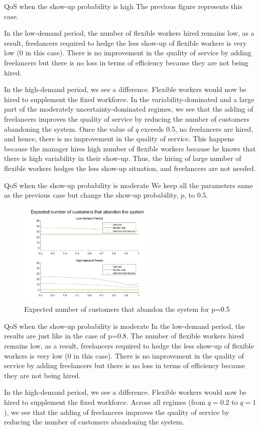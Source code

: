 \documentclass[8pt]{beamer}
\begin{document}
\begin{frame}{QoS when the show-up probability is high}
The previous figure represents this case. \bigskip

In the low-demand period, the number of flexible workers hired remains low, as a result, freelancers required to hedge the less show-up of flexible workers is very low (0 in this case). There is no improvement in the quality of service by adding freelancers but there is no loss in terms of efficiency because they are not being hired.\bigskip

In the high-demand period, we see a difference. Flexible workers would now be hired to supplement the fixed workforce. In the variability-dominated and a large part of the moderately uncertainty-dominated regimes, we see that the adding of freelancers improves the quality of service by reducing the number of customers abandoning the system. Once the value of $q$ exceeds 0.5, no freelancers are hired, and hence, there is no improvement in the quality of service. This happens because the manager hires high number of flexible workers because he knows that there is high variability in their show-up. Thus, the hiring of large number of flexible workers hedges the less show-up situation, and freelancers are not needed.
\end{frame}

\begin{frame}{QoS when the show-up probability is moderate}
We keep all the parameters same as the previous case but change the show-up probability, $p$, to $0.5$. \\
\begin{figure}[hbt!]
\includegraphics[height=5cm]{p0.5.jpg}
\caption{Expected number of customers that abandon the system for p=0.5}
\end{figure}
\end{frame}
\begin{frame}{QoS when the show-up probability is moderate}
In the low-demand period, the results are just like in the case of p=0.8. The number of flexible workers hired remains low, as a result, freelancers required to hedge the less show-up of flexible workers is very low (0 in this case). There is no improvement in the quality of service by adding freelancers but there is no loss in terms of efficiency because they are not being hired.\bigskip

In the high-demand period, we see a difference. Flexible workers would now be hired to supplement the fixed workforce. Across all regimes (from $q=0.2$ to $q=1$), we see that the adding of freelancers improves the quality of service by reducing the number of customers abandoning the system. 
\end{frame}
\end{document}
